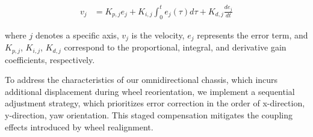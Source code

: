 \begin{align}
v_j &= K_{p,j} e_j + K_{i,j} \int_{0}^{t} e_j(\tau)  d\tau + K_{d,j} \frac{de_j}{dt} 
\end{align}

where $j$ denotes a specific axis, $v_{j}$ is the velocity, $e_{j}$ represents the error term, and $K_{p,j}$, $K_{i,j}$, $K_{d,j}$ correspond to the proportional, integral, and derivative gain coefficients, respectively.

To address the characteristics of our omnidirectional chassis, which incurs additional displacement during wheel reorientation, we implement a sequential adjustment strategy, which prioritizes error correction in the order of x-direction, y-direction, yaw orientation. This staged compensation mitigates the coupling effects introduced by wheel realignment. 
